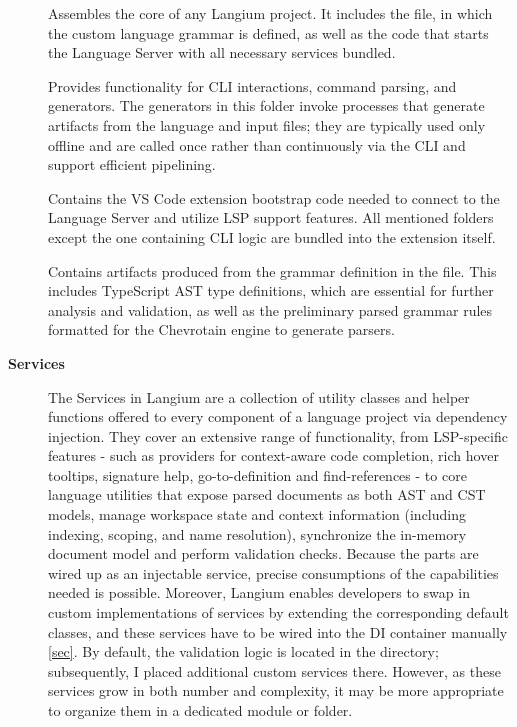 \begin{description}
  \item[] Assembles the core of any Langium project. It includes the  file, in which the custom language grammar is defined, as well as 
  the code that starts the Language Server with all necessary services bundled.
  \item[] Provides functionality for CLI interactions, command parsing, and generators. The generators in this folder invoke processes that generate artifacts
  from the language and input files; they are typically used only offline and are called once rather than continuously via the CLI and support efficient pipelining.
  \item[] Contains the VS Code extension bootstrap code needed to connect to the Language Server and utilize LSP support features.
  All mentioned folders except the one containing CLI logic are bundled into the extension itself.
  \item[] Contains artifacts produced from the grammar definition in the  file. This includes TypeScript AST type definitions,
  which are essential for further analysis and validation, as well as the preliminary parsed grammar rules formatted for the Chevrotain engine to generate parsers.
  \item[\textbf{Services}] The Services in Langium are a collection of utility classes and helper functions offered to every component of a language project via
  dependency injection. They cover an extensive range of functionality, from LSP-specific features - such as providers for context-aware code completion, rich hover
  tooltips, signature help, go-to-definition and find-references - to core language utilities that expose parsed documents as both AST and CST models, manage workspace
  state and context information (including indexing, scoping, and name resolution), synchronize the in-memory document model and perform validation checks.
  Because the parts are wired up as an injectable service, precise consumptions of the capabilities needed is possible. Moreover, Langium enables developers to swap in
  custom implementations of services by extending the corresponding default classes, and these services have to be wired into the DI container manually \ref{sec}.
  By default, the validation logic is located in the  directory; subsequently, I placed additional custom services there.
  However, as these services grow in both number and complexity, it may be more appropriate to organize them in a dedicated module or folder.
\end{description}



